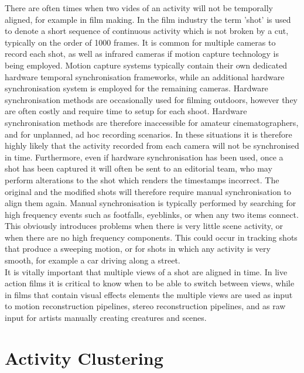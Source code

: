 There are often times when two vides of an activity will not be temporally aligned, for example in film making. In the film industry the term 'shot' is used to denote a short sequence of continuous activity which is not broken by a cut, typically on the order of 1000 frames. It is common for multiple cameras to record each shot, as well as infrared cameras if motion capture technology is being employed. Motion capture systems typically contain their own dedicated hardware temporal synchronisation frameworks, while an additional hardware synchronisation system is employed for the remaining cameras. Hardware synchronisation methods are occasionally used for filming outdoors, however they are often costly and require time to setup for each shoot. Hardware synchronisation methods are therefore inaccessible for amateur cinematographers, and for unplanned, ad hoc recording scenarios. In these situations it is therefore highly likely that the activity recorded from each camera will not be synchronised in time. Furthermore, even if hardware synchronisation has been used, once a shot has been captured it will often be sent to an editorial team, who may perform alterations to the shot which renders the timestamps incorrect. The original and the modified shots will therefore require manual synchronisation to align them again. Manual synchronisation is typically performed by searching for high frequency events such as footfalls, eyeblinks, or when any two items connect. This obviously introduces problems when there is very little scene activity, or when there are no high frequency components. This could occur in tracking shots that produce a sweeping motion, or for shots in which any activity is very smooth, for example a car driving along a street. \\

It is vitally important that multiple views of a shot are aligned in time. In live action films it is critical to know when to be able to switch between views, while in films that contain visual effects elements the multiple views are used as input to motion reconstruction pipelines, stereo reconstruction pipelines, and as raw input for artists manually creating creatures and scenes. \\

\section{Activity Clustering}
